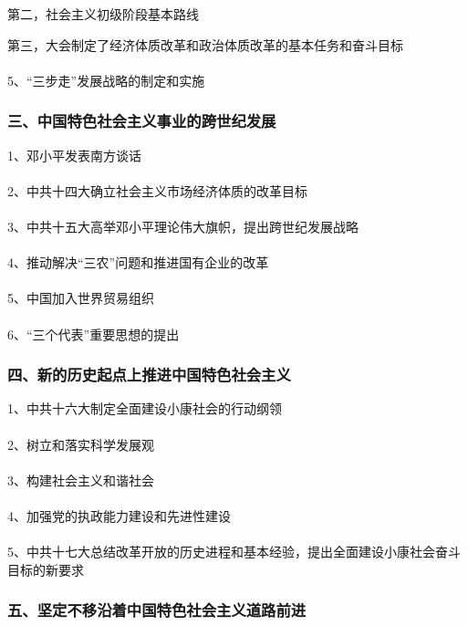 \documentclass{ctexart}
\begin{document}
第二，社会主义初级阶段基本路线

第三，大会制定了经济体质改革和政治体质改革的基本任务和奋斗目标
\\\\



5、“三步走”发展战略的制定和实施

\subsubsection{三、中国特色社会主义事业的跨世纪发展}

1、邓小平发表南方谈话
\\\\

2、中共十四大确立社会主义市场经济体质的改革目标
\\\\

3、中共十五大高举邓小平理论伟大旗帜，提出跨世纪发展战略
\\\\

4、推动解决“三农”问题和推进国有企业的改革
\\\\

5、中国加入世界贸易组织
\\\\

6、“三个代表”重要思想的提出

\subsubsection{四、新的历史起点上推进中国特色社会主义}

1、中共十六大制定全面建设小康社会的行动纲领
\\\\

2、树立和落实科学发展观
\\\\

3、构建社会主义和谐社会
\\\\

4、加强党的执政能力建设和先进性建设
\\\\

5、中共十七大总结改革开放的历史进程和基本经验，提出全面建设小康社会奋斗目标的新要求

\subsubsection{五、坚定不移沿着中国特色社会主义道路前进}
\end{document}
